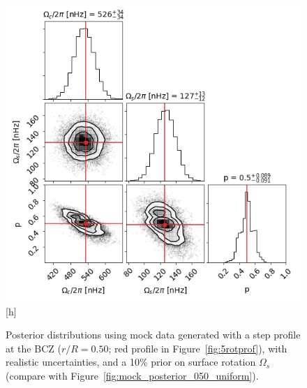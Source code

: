 \begin{figure}
\centering
    \includegraphics[width=\textwidth]{Figures/subgiant_chapter_figures/20.5_corner.png}[h]
    \caption{Posterior distributions using mock data generated with a step profile at the BCZ ($r/R = 0.50$; red profile in Figure~\ref{fig:5rotprof}), with realistic uncertainties, and a 10\% prior on surface rotation $\Omega_s$ (compare with Figure~\ref{fig:mock_posterior_050_uniform}).}
    \label{fig:mock_posterior_050_reject}
\end{figure}



